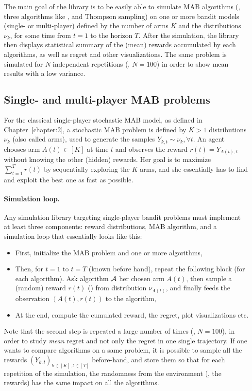 The main goal of the library is to be easily able to simulate MAB algorithms (\eg, three algorithms like \UCB, \klUCB{} and Thompson sampling) on one or more bandit models (single- or multi-player) defined by the number of arms $K$ and the distributions $\nu_k$, for some time from $t=1$ to the horizon $T$.
After the simulation, the library then displays statistical summary of the (mean) rewards accumulated by each algorithms, as well as regret and other visualizations.
The same problem is simulated for $N$ independent repetitions (\eg, $N=100$) in order to show mean results with a low variance.


\subsection{Single- and multi-player MAB problems}

For the classical single-player stochastic MAB model, as defined in Chapter~\ref{chapter:2},
a stochastic MAB problem is defined by $K>1$ distributions $\nu_k$ (also called arms),
used to generate the \iid{} samples $Y_{k,t} \sim \nu_k, \forall t$.
An agent chooses arm $A(t)\in[K]$ at time $t$ and observes the reward $r(t) = Y_{A(t),t}$ without knowing the other (hidden) rewards.
Her goal is to maximize $\sum_{t=1}^T r(t)$ by sequentially exploring the $K$ arms, and she essentially has to find and exploit the best one as fast as possible.

\paragraph{Simulation loop.}
%
Any simulation library targeting single-player bandit problems must implement at least three components:
reward distributions, MAB algorithm, and a simulation loop that essentially looks like this:
\begin{itemize}
    \item First, initialize the MAB problem and one or more algorithms,
    \item Then, for $t=1$ to $t=T$ (known before hand), repeat the following block (for each algorithm). Ask algorithm $\mathcal{A}$ her chosen arm $A(t)$, then sample a (random) reward $r(t)$ (\iid) from distribution $\nu_{A(t)}$, and finally feeds the observation $(A(t), r(t))$ to the algorithm,
    \item At the end, compute the cumulated reward, the regret, plot visualizations etc.
\end{itemize}
%
Note that the second step is repeated a large number of times (\eg, $N=100$), in order to study \emph{mean} regret and not only the regret in one single trajectory.
If one wants to compare algorithms on a same problem, it is possible to sample all the rewards $(Y_{k,t})_{k\in[K], t\in[T]}$ before-hand, and store them so that for each repetition of the simulation, the randomness from the environment (\ie, the rewards) has the same impact on all the algorithms.


